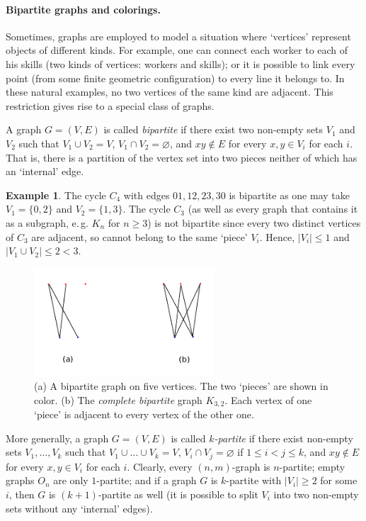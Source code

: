 \documentclass[12pt,notitlepage]{article}
\theoremstyle{plain}
\theoremstyle{definition}
\newtheorem{exm}[thm]{Example}
\theoremstyle{plain}
\newcommand{\void}{\varnothing}
\newcommand{\1}{\mathbf{1}}
\newcommand{\0}{\mathbf{0}}
\begin{document}
\paragraph{Bipartite graphs and colorings.} Sometimes, graphs are employed to model a situation where `vertices' represent objects of different kinds. For example, one can connect each worker to each of his skills (two kinds of vertices: workers and skills); or it is possible to link every point (from some finite geometric configuration) to every line it belongs to. In these natural examples, no two vertices of the same kind are adjacent. This restriction gives rise to a special class of graphs.

A graph $G = (V, E)$ is called \emph{bipartite} if there exist two non-empty sets $V_1$ and $V_2$ such that $V_1 \cup V_2 = V$, $V_1 \cap V_2 = \void$, and $x y \notin E$ for every $x, y \in V_i$ for each $i$. That is, there is a partition of the vertex set into two pieces neither of which has an `internal' edge.

\begin{exm}
The cycle $C_4$ with edges $01, 12, 23, 30$ is bipartite as one may take $V_1 = \{0, 2\}$ and $V_2 = \{1, 3\}$. The cycle $C_3$ (as well as every graph that contains it as a subgraph, e.\,g. $K_n$ for $n \geq 3$) is not bipartite since every two distinct vertices of $C_3$ are adjacent, so cannot belong to the same `piece' $V_i$. Hence, $|V_i| \leq 1$ and $|V_1 \cup V_2| \leq 2 < 3$.
\end{exm}

\begin{figure}[h]
\centering
\includegraphics*[width=0.6\textwidth]{graph_bipartite.pdf}
\caption{(a) A bipartite graph on five vertices. The two `pieces' are shown in color. (b) The \emph{complete bipartite} graph $K_{3, 2}$. Each vertex of one `piece' is adjacent to every vertex of the other one.}
\end{figure}


More generally, a graph $G = (V, E)$ is called \emph{$k$-partite} if there exist non-empty sets $V_1,\ldots, V_k$ such that $V_1 \cup \ldots \cup  V_k = V$, $V_i \cap V_j = \void$ if $1 \leq i < j \leq k$, and $x y \notin E$ for every $x, y \in V_i$ for each $i$. Clearly, every $(n,m)$-graph is $n$-partite; empty graphs $O_n$ are only $1$-partite; and if a graph $G$ is $k$-partite with $|V_i| \geq 2$ for some $i$, then $G$ is $(k+1)$-partite as well (it is possible to split $V_i$ into two non-empty sets without any `internal' edges).
\end{document}
